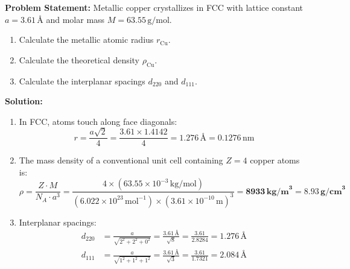 \documentclass[11pt,a4paper]{article}
\begin{document}
\begin{solbox}
\textbf{Problem Statement:} Metallic copper crystallizes in FCC with lattice constant $a = 3.61\,\text{\AA}$ and molar mass $M = 63.55\,\text{g/mol}$.
\begin{enumerate}[label=(\alph*)]
    \item Calculate the metallic atomic radius $r_{\text{Cu}}$.
    \item Calculate the theoretical density $\rho_{\text{Cu}}$.
    \item Calculate the interplanar spacings $d_{220}$ and $d_{111}$.
\end{enumerate}

\textbf{Solution:}
\begin{enumerate}[label=(\alph*)]
    \item In FCC, atoms touch along face diagonals:
    \begin{equation}
    r = \frac{a\sqrt{2}}{4} = \frac{3.61 \times 1.4142}{4} = \mathbf{1.276\,\text{\AA}} = 0.1276\,\text{nm}
    \end{equation}
    \item The mass density of a conventional unit cell containing $Z = 4$ copper atoms is:
    \begin{equation}
    \rho = \frac{Z \cdot M}{N_A \cdot a^3} = \frac{4 \times (63.55 \times 10^{-3}\,\text{kg/mol})}{(6.022 \times 10^{23}\,\text{mol}^{-1}) \times (3.61 \times 10^{-10}\,\text{m})^3} = \mathbf{8933\,\text{kg/m}^3} = \mathbf{8.93\,\text{g/cm}^3}
    \end{equation}
    \item Interplanar spacings:
    \begin{align}
    d_{220} &= \frac{a}{\sqrt{2^2 + 2^2 + 0^2}} = \frac{3.61\,\text{\AA}}{\sqrt{8}} = \frac{3.61}{2.8284} = \mathbf{1.276\,\text{\AA}} \\
    d_{111} &= \frac{a}{\sqrt{1^2 + 1^2 + 1^2}} = \frac{3.61\,\text{\AA}}{\sqrt{3}} = \frac{3.61}{1.7321} = \mathbf{2.084\,\text{\AA}}
    \end{align}
\end{enumerate}
\end{solbox}
\end{document}
